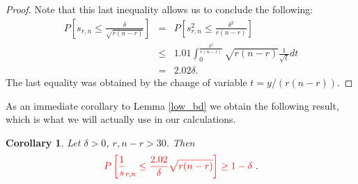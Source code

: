 \documentclass{article}
\newcommand{\red}[1]{\textcolor{red}{#1}}
\newtheorem{lemma}[theorem]{Lemma}
\newtheorem{corollary}[theorem]{Corollary}
\theoremstyle{definition}
\newcommand{\smin}{s_{r,n}}
\begin{document}
\begin{proof}
Note that this last inequality allows us to conclude the following:
\begin{eqnarray*}
P\left [ \smin \leq \frac{\delta}{\sqrt{r(n-r)}} \right] & = & P\left [ \smin^2 \leq \frac{\delta^2}{r(n-r)} \right] \\
& \leq &  1.01 \int_0^{\frac{\delta^2}{r(n-r)}} \sqrt{r(n-r)} \frac{1}{\sqrt{t}} dt  \\
& = &  2.02 \delta. 
\end{eqnarray*}
The last equality was obtained by the change of variable $t = y/(r(n-r))$. 

\end{proof}

As an immediate corollary to Lemma \ref{low_bd} we obtain the following result, which is what we will actually use in our calculations.

\begin{corollary} 
 \label{lowbd}
 Let $\delta>0$, $r, n-r>30$. Then 
$$\red{P\left [ \frac1\smin \leq \frac{2.02}{\delta}\sqrt{r(n-r)} \right] \geq 1-\delta}~.$$
\end{corollary}




\end{document}

